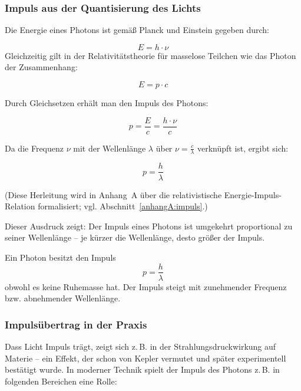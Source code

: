 \subsubsection{Impuls aus der Quantisierung des Lichts}

Die Energie eines Photons ist gemäß Planck und Einstein gegeben durch:

\[
E = h \cdot \nu
\]
\newpage
\noindent
Gleichzeitig gilt in der Relativitätstheorie für masselose Teilchen wie das Photon der Zusammenhang:

\[
E = p \cdot c
\]

Durch Gleichsetzen erhält man den Impuls des Photons:

\[
p = \frac{E}{c} = \frac{h \cdot \nu}{c}
\]

Da die Frequenz \(\nu\) mit der Wellenlänge \(\lambda\) über \(\nu = \frac{c}{\lambda}\) verknüpft ist, ergibt sich:

\[
p = \frac{h}{\lambda} \tag{III.3}
\]

(Diese Herleitung wird in Anhang~A über die relativistische Energie-Impuls-Relation formalisiert; vgl. Abschnitt~\ref{anhangA:impuls}.)

Dieser Ausdruck zeigt: Der Impuls eines Photons ist umgekehrt proportional zu seiner Wellenlänge – je kürzer die Wellenlänge, desto größer der Impuls.
\vspace{1em}
\begin{tcolorbox}[physikbox,title=Photonenimpuls]
	\label{box:Photonenimpuls}
	Ein Photon besitzt den Impuls
	\[
	p = \frac{h}{\lambda}
	\]
	obwohl es keine Ruhemasse hat. Der Impuls steigt mit zunehmender Frequenz bzw. abnehmender Wellenlänge.
\end{tcolorbox}

\subsubsection{Impulsübertrag in der Praxis}

Dass Licht Impuls trägt, zeigt sich z.\,B. in der Strahlungsdruckwirkung auf Materie – ein Effekt, der schon von Kepler vermutet und später experimentell bestätigt wurde. 
\newpage
\noindent
In moderner Technik spielt der Impuls des Photons z.\,B. in folgenden Bereichen eine Rolle:

